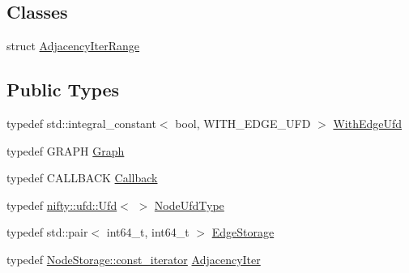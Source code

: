 \subsection*{Classes}
\begin{DoxyCompactItemize}
\item 
struct \hyperlink{structnifty_1_1graph_1_1EdgeContractionGraph_1_1AdjacencyIterRange}{Adjacency\+Iter\+Range}
\end{DoxyCompactItemize}
\subsection*{Public Types}
\begin{DoxyCompactItemize}
\item 
typedef std\+::integral\+\_\+constant$<$ bool, W\+I\+T\+H\+\_\+\+E\+D\+G\+E\+\_\+\+U\+F\+D $>$ \hyperlink{classnifty_1_1graph_1_1EdgeContractionGraph_a9b33be5b2975fe298604326c10df1f93}{With\+Edge\+Ufd}
\item 
typedef G\+R\+A\+P\+H \hyperlink{classnifty_1_1graph_1_1EdgeContractionGraph_a22f00237e657f393dfcaacdc10de9bba}{Graph}
\item 
typedef C\+A\+L\+L\+B\+A\+C\+K \hyperlink{classnifty_1_1graph_1_1EdgeContractionGraph_a75e91e51c78d2f427a31c30dcd8996ed}{Callback}
\item 
typedef \hyperlink{classnifty_1_1ufd_1_1Ufd}{nifty\+::ufd\+::\+Ufd}$<$  $>$ \hyperlink{classnifty_1_1graph_1_1EdgeContractionGraph_a7ff98238621f4b534e89b1880ee77239}{Node\+Ufd\+Type}
\item 
typedef std\+::pair$<$ int64\+\_\+t, int64\+\_\+t $>$ \hyperlink{classnifty_1_1graph_1_1EdgeContractionGraph_ad57e807f7df20892c7bbbb9b53d3aa08}{Edge\+Storage}
\item 
typedef \hyperlink{classnifty_1_1container_1_1FlatSet_a0f4cd26da060859b18742abfd534aa24}{Node\+Storage\+::const\+\_\+iterator} \hyperlink{classnifty_1_1graph_1_1EdgeContractionGraph_a447212f5ced0c4ef4d304e8b89f4f200}{Adjacency\+Iter}
\end{DoxyCompactItemize}
